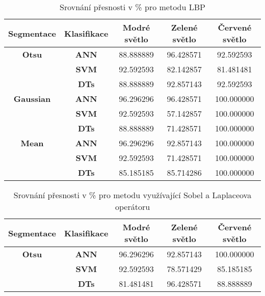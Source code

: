 \capstartfalse
\begin{table}[!htbp]
\centering
\begin{tabular}{|c|c|c|c|c|}
\hline
\textbf{Segmentace} & \textbf{Klasifikace} & \textbf{Modré světlo} & \textbf{Zelené světlo} & \textbf{Červené světlo} \\ \hline
\textbf{Otsu}       & \textbf{ANN}         & 88.888889             & 96.428571              & 92.592593               \\ \hline
\textbf{}           & \textbf{SVM}         & 92.592593             & 82.142857              & 81.481481               \\ \hline
\textbf{}           & \textbf{DTs}         & 88.888889             & 92.857143              & 92.592593               \\ \hline
\textbf{Gaussian}   & \textbf{ANN}         & 96.296296             & 96.428571              & 100.000000              \\ \hline
\textbf{}           & \textbf{SVM}         & 92.592593             & 57.142857              & 100.000000              \\ \hline
\textbf{}           & \textbf{DTs}         & 88.888889             & 71.428571              & 100.000000              \\ \hline
\textbf{Mean}       & \textbf{ANN}         & 96.296296             & 92.857143              & 100.000000              \\ \hline
\textbf{}           & \textbf{SVM}         & 92.592593             & 71.428571              & 100.000000              \\ \hline
\textbf{}           & \textbf{DTs}         & 85.185185             & 85.714286              & 100.000000              \\ \hline
\end{tabular}
\caption{Srovnání přesnosti v \% pro metodu LBP }
\end{table}
\capstarttrue

\capstartfalse
\begin{table}[!htbp]
\centering
\begin{tabular}{|c|c|c|c|c|}
\hline
\textbf{Segmentace} & \textbf{Klasifikace} & \textbf{Modré světlo} & \textbf{Zelené světlo} & \textbf{Červené světlo} \\ \hline
\textbf{Otsu}       & \textbf{ANN}         & 96.296296             & 92.857143              & 100.000000              \\ \hline
\textbf{}           & \textbf{SVM}         & 92.592593             & 78.571429              & 85.185185               \\ \hline
\textbf{}           & \textbf{DTs}         & 81.481481             & 96.428571              & 88.888889               \\ \hline 
\end{tabular}
\caption{Srovnání přesnosti v \% pro metodu využívající Sobel a Laplaceova operátoru }
\end{table}
\capstarttrue






